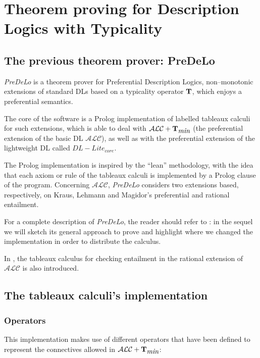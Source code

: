 \documentclass[a4paper, 11pt, oneside]{duthesis}
\newcommand{\tip}{{\bf T}}
\newcommand{\alc}{\mathcal{ALC}}
\newcommand{\alctmin}{\mathcal{ALC}+\tip_{\mbox{\em min}}}
\begin{document}
\chapter{Theorem proving for Description Logics with Typicality}\label{chap_theorem_proving}

\section{The previous theorem prover: PreDeLo}\label{predelo}
\emph{PreDeLo} is a theorem prover for Preferential Description Logics, non--monotonic extensions of standard DLs based on a typicality operator $\tip$, which enjoys a preferential semantics.

The core of the software is a Prolog implementation of labelled tableaux calculi for such extensions, which is able to deal with $\alctmin$ (the preferential extension of the basic DL $\alc$), as well as with the preferential extension of the lightweight DL called $DL-Lite_{core}$.

The Prolog implementation is inspired by the ``lean'' methodology, with the idea that each axiom or rule of the tableaux calculi is implemented by a Prolog clause of the program.
Concerning $\alc$, \emph{PreDeLo} considers two extensions based, respectively, on Kraus, Lehmann and Magidor’s preferential and rational entailment.

For a complete description of \emph{PreDeLo}, the reader should refer to \cite{conf/aiia/GiordanoGJOP13}: in the sequel we will sketch its general approach to prove and highlight where we changed the implementation in order to distribute the calculus.

In \cite{conf/aiia/GiordanoGJOP13}, the tableaux calculus for checking entailment in the rational extension of $\alc$ is also introduced.

\section{The tableaux calculi's implementation}\label{tableaux_implementation}

\subsection{Operators}

This implementation makes use of different operators that have been defined to represent the connectives allowed in $\alctmin$:
\end{document}
